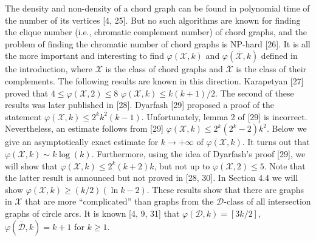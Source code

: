 \documentclass{article}
\theoremstyle{definition}
\begin{document}
    The density and non-density
    of a chord graph can be found 
    in polynomial time of 
    the number of its vertices [4, 25]. 
    But no such algorithms are known 
    for finding the clique 
    number (i.e., chromatic 
    complement number)
    of chord graphs, and the 
    problem of finding the 
    chromatic number of chord
    graphs is NP-hard [26]. 
    It is all the more 
    important and interesting
    to find $\varphi(\mathcal{X}, k)$ and 
    $\varphi(\overline{\mathcal{X}}, k)$
    defined in the introduction, 
    where $\mathcal{X}$ is the 
    class of chord graphs and
    $\overline{\mathcal{X}}$
    is the class of their 
    complements. 
    The following results 
    are known in this direction. 
    Karapetyan [27] proved that 
    $4 \leq \varphi\left(\mathcal{X}, 2\right) \leq 8$
    $\varphi\left(\mathcal{X}, k\right) \leq k(k+1)/2$. 
    The second of these 
    results was later published in [28]. 
    Dyarfash [29] proposed a proof 
    of the statement $\varphi\left(\mathcal{X}, k\right) \leq 2^k k^2 (k-1)$. 
    Unfortunately, lemma 2 of [29] is incorrect. 
    Nevertheless, an estimate follows from [29] 
    $\varphi\left(\mathcal{X}, k\right) \leq 2^k (2^k - 2)k^2$. 
    Below we give an asymptotically exact 
    estimate for $k \rightarrow +\infty$
    of $\varphi\left(\mathcal{X}, k\right)$. 
    It turns out that $\varphi\left(\mathcal{X}, k\right) \sim k \log (k)$. 
    Furthermore, using the idea of 
    Dyarfash's proof [29], 
    we will show that $\varphi\left(\mathcal{X}, k\right) \leq 2^k(k+2)k$, 
    but not up to $\varphi\left(\mathcal{X}, 2\right) \leq 5$.  
    Note that the latter result 
    is announced but 
    not proved in [28, 30]. 
    In Section 4.4 we will show 
    $\varphi(\mathcal{X}, k) \geq (k/2)(\ln k - 2)$. 
    These results show that there 
    are graphs in $\mathcal{X}$
    that are more “complicated” 
    than graphs from the
    $\mathcal{D}$-class of all 
    intersection graphs of circle arcs. 
    It is known [4, 9, 31] that $\varphi\left(\mathcal{D}, k\right) = [3k/2]$, 
    $\varphi(\bar{\mathcal{D}}, k) = k+1$
    for $k \geq 1$.
\end{document}

